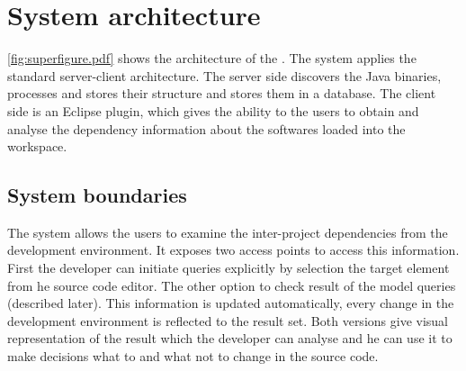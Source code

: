 % 
% 


 

  

\section{System architecture}

\autoref{fig:superfigure.pdf} shows the architecture of the \ptool{}.
The system applies the standard server-client
architecture. The server side discovers the Java binaries, processes and stores
their structure and stores them in a database. The client side is an Eclipse
plugin, which gives the ability to the users to obtain and analyse the
dependency information about the softwares loaded into the workspace. 


\subsection{System boundaries}
The system allows the users to examine the inter-project dependencies from the
development environment. It exposes two access points to access this
information. First the developer can initiate queries explicitly by selection
the target element from  he source code editor. The other option to check result
of the model queries (described later). This information is updated
automatically, every change in the development environment is reflected to the
result set. Both versions give visual representation of the result which the
developer can analyse and he can use it to make decisions what to and what not
to change in the source code.


